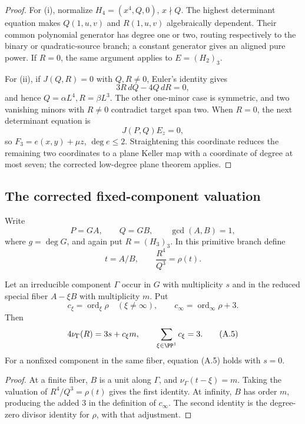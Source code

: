 \begin{proof}
For (i), normalize \(H_4=(x^4,Q,0)\), \(x\nmid Q\).  The highest
determinant equation makes \(Q(1,u,v)\) and \(R(1,u,v)\) algebraically
dependent.  Their common polynomial generator has degree one or two,
routing respectively to the binary or quadratic-source branch; a constant
generator gives an aligned pure power.  If \(R=0\), the same argument
applies to \(E=(H_2)_3\).

For (ii), if \(J(Q,R)=0\) with \(Q,R\ne0\), Euler's identity gives
\[
 3R\,dQ-4Q\,dR=0,
\]
and hence \(Q=\alpha L^4,R=\beta L^3\).  The other one-minor case is
symmetric, and two vanishing minors with \(R\ne0\) contradict target span
two.  When \(R=0\), the next determinant equation is
\[
 J(P,Q)E_z=0,
\]
so \(F_3=e(x,y)+\mu z\), \(\deg e\le2\).  Straightening this coordinate
reduces the remaining two coordinates to a plane Keller map with a
coordinate of degree at most seven; the corrected low-degree plane theorem
applies.
\end{proof}

\subsection{The corrected fixed-component valuation}

Write
\[
 P=GA,\qquad Q=GB,\qquad \gcd(A,B)=1,
\]
where \(g=\deg G\), and again put \(R=(H_3)_3\).  In this primitive branch
define
\[
 t=A/B,\qquad \frac{R^4}{Q^3}=\rho(t).
\]

\begin{lemma}
\label{lem:fixed-component-valuation}
Let an irreducible component \(\Gamma\) occur in \(G\) with multiplicity
\(s\) and in the reduced special fiber \(A-\xi B\) with multiplicity
\(m\).  Put
\[
 c_\xi=\operatorname{ord}_\xi\rho
 \quad(\xi\ne\infty),\qquad
 c_\infty=\operatorname{ord}_\infty\rho+3.
\]
Then
\[
 4\nu_\Gamma(R)=3s+c_\xi m,\qquad
 \sum_{\xi\in\PP^1}c_\xi=3.                 \tag{A.5}
\]
For a nonfixed component in the same fiber, equation (A.5) holds with
\(s=0\).
\end{lemma}

\begin{proof}
At a finite fiber, \(B\) is a unit along \(\Gamma\), and
\(\nu_\Gamma(t-\xi)=m\).  Taking the valuation of
\(R^4/Q^3=\rho(t)\) gives the first identity.  At infinity, \(B\) has
order \(m\), producing the added \(3\) in the definition of
\(c_\infty\).  The second identity is the degree-zero divisor identity for
\(\rho\), with that adjustment.
\end{proof}

